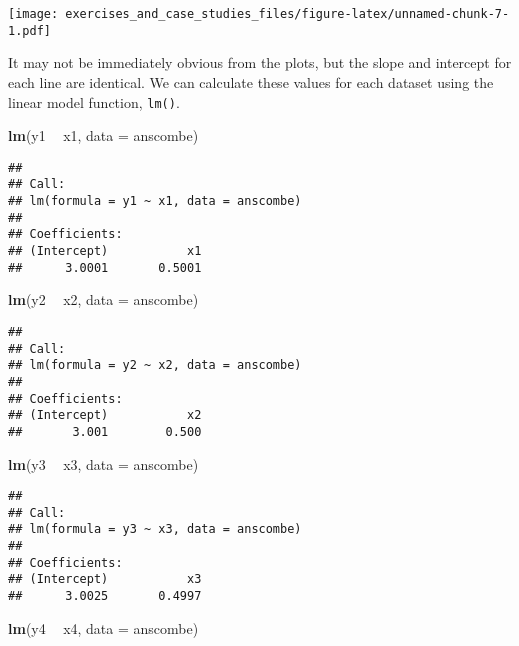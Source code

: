 \documentclass[]{book}
\newenvironment{Shaded}{\begin{snugshade}}{\end{snugshade}}
\newcommand{\DataTypeTok}[1]{\textcolor[rgb]{0.13,0.29,0.53}{#1}}
\newcommand{\KeywordTok}[1]{\textcolor[rgb]{0.13,0.29,0.53}{\textbf{#1}}}
\newcommand{\NormalTok}[1]{#1}
\newcommand{\OperatorTok}[1]{\textcolor[rgb]{0.81,0.36,0.00}{\textbf{#1}}}
\newcommand{\StringTok}[1]{\textcolor[rgb]{0.31,0.60,0.02}{#1}}
\theoremstyle{definition}
\theoremstyle{definition}
\theoremstyle{definition}
\theoremstyle{remark}
\begin{document}
\texttt{[image: exercises\_and\_case\_studies\_files/figure-latex/unnamed-chunk-7-1.pdf]}

It may not be immediately obvious from the plots, but the slope and
intercept for each line are identical. We can calculate these values for
each dataset using the linear model function, \texttt{lm()}.

\begin{Shaded}
\begin{Highlighting}[]
\KeywordTok{lm}\NormalTok{(y1 }\OperatorTok{~}\StringTok{ }\NormalTok{x1, }\DataTypeTok{data =}\NormalTok{ anscombe)}
\end{Highlighting}
\end{Shaded}

\begin{verbatim}
## 
## Call:
## lm(formula = y1 ~ x1, data = anscombe)
## 
## Coefficients:
## (Intercept)           x1  
##      3.0001       0.5001
\end{verbatim}

\begin{Shaded}
\begin{Highlighting}[]
\KeywordTok{lm}\NormalTok{(y2 }\OperatorTok{~}\StringTok{ }\NormalTok{x2, }\DataTypeTok{data =}\NormalTok{ anscombe)}
\end{Highlighting}
\end{Shaded}

\begin{verbatim}
## 
## Call:
## lm(formula = y2 ~ x2, data = anscombe)
## 
## Coefficients:
## (Intercept)           x2  
##       3.001        0.500
\end{verbatim}

\begin{Shaded}
\begin{Highlighting}[]
\KeywordTok{lm}\NormalTok{(y3 }\OperatorTok{~}\StringTok{ }\NormalTok{x3, }\DataTypeTok{data =}\NormalTok{ anscombe)}
\end{Highlighting}
\end{Shaded}

\begin{verbatim}
## 
## Call:
## lm(formula = y3 ~ x3, data = anscombe)
## 
## Coefficients:
## (Intercept)           x3  
##      3.0025       0.4997
\end{verbatim}

\begin{Shaded}
\begin{Highlighting}[]
\KeywordTok{lm}\NormalTok{(y4 }\OperatorTok{~}\StringTok{ }\NormalTok{x4, }\DataTypeTok{data =}\NormalTok{ anscombe)}
\end{Highlighting}
\end{Shaded}
\end{document}
